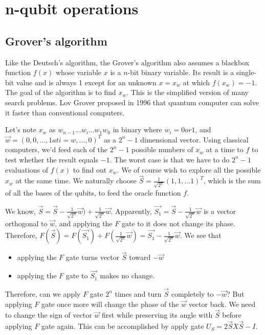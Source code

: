 \documentclass{book}
\begin{document}
\chapter{n-qubit operations}

\section{Grover's algorithm}
Like the Deutsch's algorithm, the Grover's algorithm also assumes a blackbox function $f(x)$ whose variable $x$ is a $n$-bit binary variable. Its result is a single-bit value and is always 1 except for an unknown $x=x_w$ at which $f(x_w)=-1$. The goal of the algorithm is to find $x_w$. This is the simplified version of many search problems. Lov Grover proposed in 1996 that quantum computer can solve it faster than conventional computers.

Let's note $x_w$ as $w_{n-1}...w_i...w_1 w_0$ in binary where $w_i = 0 or 1$, and $\Vec{w} = (0, 0, ..., 1 at i=w, ..., 0)^T$ as a $2^n-1$ dimensional vector. Using classical computers, we'd feed each of the $2^n -1$ possible numbers of $x_w$ at a time to $f$ to test whether the result equals $-1$. The worst case is that we have to do $2^n-1$ evaluations of $f(x)$ to find out $x_w$. We of course wish to explore all the possible $x_w$ at the same time. We naturally choose $\vec{S} = \frac 1 {\sqrt{2^n}} (1, 1, ...1)^T$, which is the sum of all the bases of the qubits, to feed the oracle function $f$.

We know, $\vec{S} = \vec{S} - \frac 1 {\sqrt{2^n}} \vec{w}) + \frac 1  {\sqrt{2^n}} \vec{w}$. Apparently, $\vec{S_1}  = \vec{S} - \frac 1 {\sqrt{2^n}} \vec{w}$ is a vector orthogonal to $\vec{w}$, and applying the $F$ gate to it does not change its phase. Therefore, $F(\vec{S}) = F(\vec{S_1}) + F(\frac 1  {\sqrt{2^n}} \vec{w})  = \vec{S_1} - \frac 1 {\sqrt{2^n}} \vec{w}$. We see that 
\begin{itemize}
    \item applying the $F$ gate turns vector $\vec{S}$ toward $-\vec{w}$
    \item applying the $F$ gate to $\vec{S_1}$ makes no change.
\end{itemize}
Therefore, can we apply $F$ gate $2^n$ times and turn $\vec{S}$ completely to $-\vec{w}$? But applying $F$ gate once more will change the phase of the $\vec{w}$ vector back. We need to change the sign of vector $\vec{w}$ first while preserving its angle with $\vec{S}$ before applying $F$ gate again. This can be accomplished by apply gate $U_S = 2 \vec{S}X\vec{S} -I$.
\end{document}
